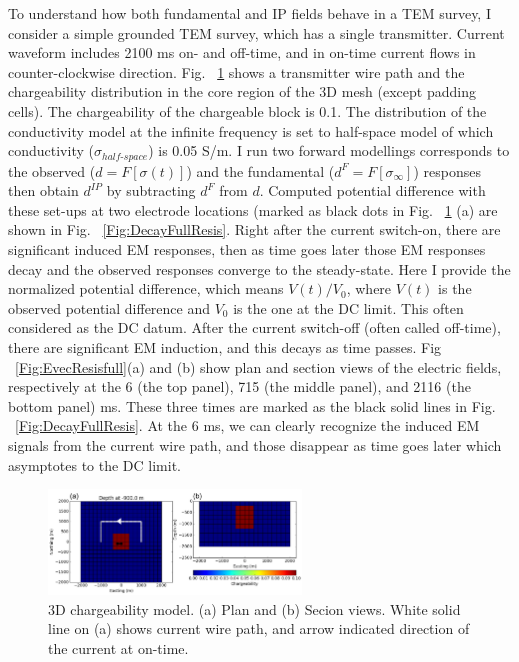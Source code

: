\documentclass[letterpaper,11pt]{article}
\newcommand{\siginf}{\sigma_\infty}
\newcommand{\dip}{d^{IP}}
\begin{document}
To understand how both fundamental and IP fields behave in a TEM survey, I consider a simple grounded TEM survey, which has a single transmitter. Current waveform includes 2100 ms on- and off-time, and in on-time current flows in counter-clockwise direction. Fig. ~\ref{Fig:chargmodel} shows a transmitter wire path and the chargeability distribution in the core region of the 3D mesh (except padding cells). The chargeability of the chargeable block is 0.1. The distribution of the conductivity model at the infinite frequency is set to half-space model of which conductivity ($\sigma_{half\text{-}space}$) is 0.05 S/m. I run two forward modellings corresponds to the observed ($d=F[\sigma(t)]$) and the fundamental ($d^F=F[\siginf]$) responses then obtain $\dip$ by subtracting $d^F$ from $d$. Computed potential difference with these set-ups at two electrode locations (marked as black dots in Fig. ~\ref{Fig:chargmodel} (a) are shown in Fig. ~\ref{Fig:DecayFullResis}. Right after the current switch-on, there are significant induced EM responses, then as time goes later those EM responses decay and the observed responses converge to the steady-state. Here I provide the normalized potential difference, which means $V(t)/V_0$, where $V(t)$ is the observed potential difference and $V_0$ is the one at the DC limit. This often considered as the DC datum. After the current switch-off (often called off-time), there are significant EM induction, and this decays as time passes. Fig ~\ref{Fig:EvecResisfull}(a) and (b) show plan and section views of the electric fields, respectively at the 6 (the top panel), 715 (the middle panel), and 2116 (the bottom panel) ms. These three times are marked as the black solid lines in Fig. ~\ref{Fig:DecayFullResis}. At the 6 ms, we can clearly recognize the induced EM signals from the current wire path, and those disappear as time goes later which asymptotes to the DC limit. 

\begin{figure}[htb]
  \centering
  \includegraphics[width=0.6\textwidth]{figures/chargmodel.png}
  \caption{3D chargeability model. (a) Plan and (b) Secion views. White solid line on (a) shows current wire path, and arrow indicated direction of the current at on-time. }
  \label{Fig:chargmodel}
\end{figure}
\end{document}
